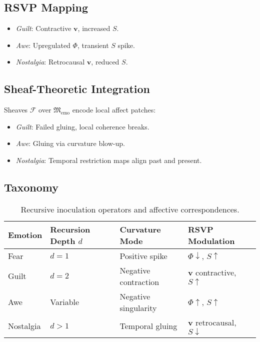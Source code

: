 \documentclass{article}
\theoremstyle{definition}
\begin{document}
\subsection{RSVP Mapping}
\begin{itemize}
  \item \emph{Guilt}: Contractive $\mathbf{v}$, increased $S$.
  \item \emph{Awe}: Upregulated $\Phi$, transient $S$ spike.
  \item \emph{Nostalgia}: Retrocausal $\mathbf{v}$, reduced $S$.
\end{itemize}

\subsection{Sheaf-Theoretic Integration}
Sheaves $\mathcal{F}$ over $\mathfrak{M}_{\text{emo}}$ encode local affect patches:
\begin{itemize}
  \item \emph{Guilt}: Failed gluing, local coherence breaks.
  \item \emph{Awe}: Gluing via curvature blow-up.
  \item \emph{Nostalgia}: Temporal restriction maps align past and present.
\end{itemize}

\subsection{Taxonomy}
\begin{table}[ht]
\centering
\caption{Recursive inoculation operators and affective correspondences.}
\label{tab:inoculation}
\renewcommand{\arraystretch}{1.3}
\begin{tabularx}{\textwidth}{@{}l>{\centering\arraybackslash}X>{\centering\arraybackslash}X>{\centering\arraybackslash}X@{}}
\toprule
\textbf{Emotion} & \textbf{Recursion Depth $d$} & \textbf{Curvature Mode} & \textbf{RSVP Modulation} \\
\midrule
Fear & $d=1$ & Positive spike & $\Phi \downarrow$, $S \uparrow$ \\
Guilt & $d=2$ & Negative contraction & $\mathbf{v}$ contractive, $S \uparrow$ \\
Awe & Variable & Negative singularity & $\Phi \uparrow$, $S \uparrow$ \\
Nostalgia & $d>1$ & Temporal gluing & $\mathbf{v}$ retrocausal, $S \downarrow$ \\
\bottomrule
\end{tabularx}
\end{table}
\end{document}
